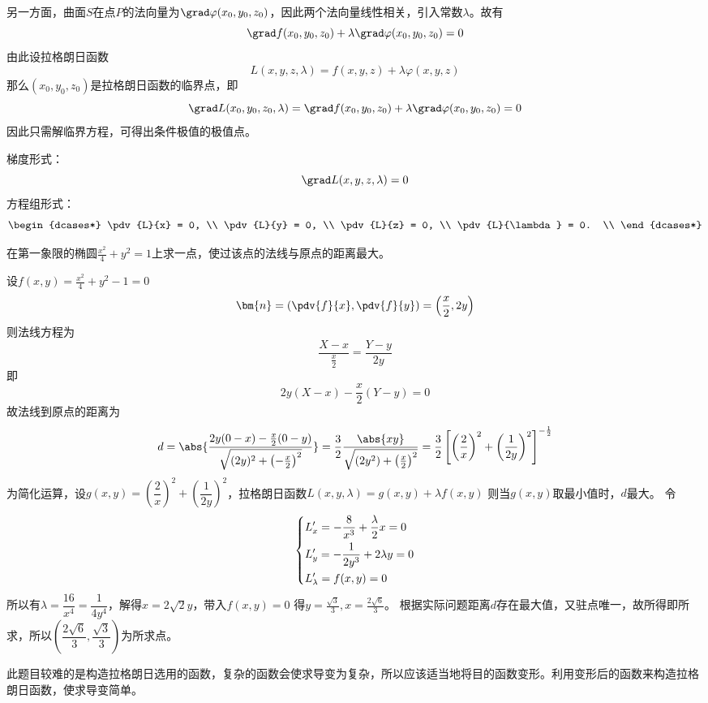 另一方面，曲面$S$在点$P$的法向量为$\grad\varphi(x_0,y_0,z_0)$，因此两个法向量线性相关，引入常数$\lambda$。故有
\[ \grad f(x_0,y_0,z_0) + \lambda\grad\varphi(x_0,y_0,z_0) = 0 \]
由此设拉格朗日函数
\begin{equation}
    \label{eq:拉格朗日函数}
    L(x,y,z,\lambda) = f(x,y,z) + \lambda\varphi(x,y,z)
\end{equation}
那么$(x_0,y_0,z_0)$是拉格朗日函数的临界点，即
\[ \grad L(x_0,y_0,z_0,\lambda) = \grad f(x_0,y_0,z_0) + \lambda\grad\varphi(x_0,y_0,z_0) = 0 \]
因此只需解临界方程，可得出条件极值的极值点。

梯度形式：
\begin{equation}
    \label{eq:拉格朗日临界方程}
    \grad L(x,y,z,\lambda) = 0
\end{equation}
方程组形式：
\begin{equation}
    \begin{dcases*}
        \pdv{L}{x} = 0,       \\
        \pdv{L}{y} = 0,       \\
        \pdv{L}{z} = 0,       \\
        \pdv{L}{\lambda} = 0. \\
    \end{dcases*}
\end{equation}

\begin{example}
    在第一象限的椭圆$\frac{x^2}{4} + y^2 = 1$上求一点，使过该点的法线与原点的距离最大。
\end{example}
\begin{solution}
    设$f(x,y) = \frac{x^2}{4} + y^2 - 1 = 0$
    \[ \bm{n} = \left(\pdv{f}{x}, \pdv{f}{y}\right) = \left(\frac{x}{2}, 2y\right) \]
    则法线方程为
    \[ \frac{X - x}{\frac{x}{2}} = \frac{Y - y}{2y} \]
    即
    \[ 2y(X-x)-\frac{x}{2}(Y-y) = 0 \]
    故法线到原点的距离为
    \[
        d
        = \abs{\frac{2y(0-x)-\frac{x}{2}(0-y)}{\sqrt{(2y)^2 + \left(-\frac{x}{2}\right)^2}}}
        = \frac{3}{2}\frac{\abs{xy}}{\sqrt{(2y^2)+\left(\frac{x}{2}\right)^2}}
        = \frac{3}{2} \left[\left(\frac{2}{x}\right)^2 + \left(\frac{1}{2y}\right)^2\right]^{-\frac{1}{2}}
    \]
    为简化运算，设$g(x,y) = (\dfrac{2}{x})^2 + (\dfrac{1}{2y})^2$，拉格朗日函数$L(x,y,\lambda) = g(x,y) + \lambda f(x,y)$
    则当$g(x,y)$取最小值时，$d$最大。
    令
    \[
        \begin{dcases}
            L'_x = -\frac{8}{x^3} + \frac{\lambda}{2} x = 0 \\
            L'_y = -\frac{1}{2y^3} + 2\lambda y = 0         \\
            L'_\lambda = f(x,y)=0
        \end{dcases}
    \]
    所以有$\lambda = \dfrac{16}{x^4} = \dfrac{1}{4y^4}$，解得$x=2\sqrt{2}y$，带入$f(x,y)=0$
    得$y = \frac{\sqrt{3}}{3},x=\frac{2\sqrt{6}}{3}$。
    根据实际问题距离$d$存在最大值，又驻点唯一，故所得即所求，所以$\left(\dfrac{2\sqrt{6}}{3}, \dfrac{\sqrt{3}}{3}\right)$为所求点。
\end{solution}

此题目较难的是构造拉格朗日选用的函数，复杂的函数会使求导变为复杂，所以应该适当地将目的函数变形。利用变形后的函数来构造拉格朗日函数，使求导变简单。